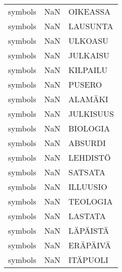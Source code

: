 \begin{tabular}{lll}
 symbols &  NaN &        OIKEASSA \\
 symbols &  NaN &        LAUSUNTA \\
 symbols &  NaN &         ULKOASU \\
 symbols &  NaN &        JULKAISU \\
 symbols &  NaN &        KILPAILU \\
 symbols &  NaN &          PUSERO \\
 symbols &  NaN &         ALAMÄKI \\
 symbols &  NaN &       JULKISUUS \\
 symbols &  NaN &        BIOLOGIA \\
 symbols &  NaN &         ABSURDI \\
 symbols &  NaN &        LEHDISTÖ \\
 symbols &  NaN &         SATSATA \\
 symbols &  NaN &        ILLUUSIO \\
 symbols &  NaN &        TEOLOGIA \\
 symbols &  NaN &         LASTATA \\
 symbols &  NaN &        LÄPÄISTÄ \\
 symbols &  NaN &        ERÄPÄIVÄ \\
 symbols &  NaN &        ITÄPUOLI \\
\bottomrule
\end{tabular}
